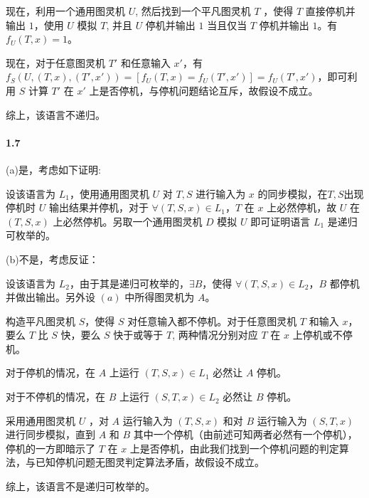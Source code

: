\documentclass[12pt, a4paper, oneside]{ctexart}
\begin{document}
	现在，利用一个通用图灵机 $U$, 然后找到一个平凡图灵机 $T$ ，使得 $T$ 直接停机并输出 $1$，使用 $U$ 模拟 $T$, 并且 $U$ 停机并输出 $1$ 当且仅当 $T$ 停机并输出 $1$。有 $f_U(T,x) = 1$。
	
	现在，对于任意图灵机 $T'$ 和任意输入 $x'$，有 $f_S(U,(T,x),(T',x')) = [f_U(T,x)=f_U(T',x')] = f_U(T',x')$，即可利用 $S$ 计算 $T'$ 在 $x'$ 上是否停机，与停机问题结论互斥，故假设不成立。
	
	综上，该语言不递归。
	\paragraph{1.7}
	
	(a)是，考虑如下证明:
	
	设该语言为 $L_1$，使用通用图灵机 $U$ 对 $T,S$ 进行输入为 $x$ 的同步模拟，在$T,S$出现停机时 $U$ 输出结果并停机，对于 $\forall (T,S,x)\in L_1$，$T$ 在 $x$ 上必然停机，故 $U$ 在 $(T,S,x)$ 上必然停机。另取一个通用图灵机 $D$ 模拟 $U$ 即可证明语言 $L_1$ 是递归可枚举的。
	
	(b)不是，考虑反证：
	
	设该语言为 $L_2$，由于其是递归可枚举的，$\exists B$，使得 $\forall (T,S,x)\in L_2$，$B$ 都停机并做出输出。另外设 $(a)$ 中所得图灵机为 $A$。
	
	构造平凡图灵机 $S$，使得 $S$ 对任意输入都不停机。对于任意图灵机 $T$ 和输入 $x$，要么 $T$ 比 $S$ 快，要么 $S$ 快于或等于 $T$, 两种情况分别对应 $T$ 在 $x$ 上停机或不停机。
	
	对于停机的情况，在 $A$ 上运行 $(T,S,x)\in L_1$ 必然让 $A$ 停机。
	
	对于不停机的情况，在 $B$ 上运行 $(S,T,x)\in L_2$ 必然让 $B$ 停机。
	
	采用通用图灵机 $U$ ，对 $A$ 运行输入为 $(T,S,x)$ 和对 $B$ 运行输入为 $(S,T,x)$ 进行同步模拟，直到 $A$ 和 $B$ 其中一个停机（由前述可知两者必然有一个停机），停机的一方即暗示了 $T$ 在 $x$ 上是否停机，由此我们找到一个停机问题的判定算法，与已知停机问题无图灵判定算法矛盾，故假设不成立。
	
	综上，该语言不是递归可枚举的。
	
\end{document}
